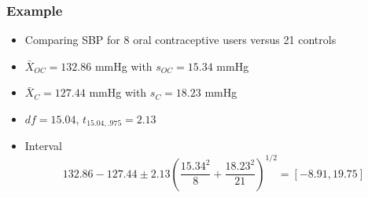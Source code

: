 \documentclass[aspectratio=169]{beamer}
\begin{document}
\begin{frame}\frametitle{Example}
\begin{itemize}
\item Comparing SBP for 8 oral contraceptive users versus 21 controls
\item $\bar X_{OC} = 132.86$ mmHg with $s_{OC} = 15.34$ mmHg
\item $\bar X_{C} = 127.44$ mmHg with $s_{C} = 18.23$ mmHg
\item $df=15.04$, $t_{15.04, .975} = 2.13$
\item Interval
$$
132.86 - 127.44 \pm 2.13 \left(\frac{15.34^2}{8} + \frac{18.23^2}{21} \right)^{1/2}
= [-8.91, 19.75]
$$
\end{itemize}
\end{frame}
\end{document}
